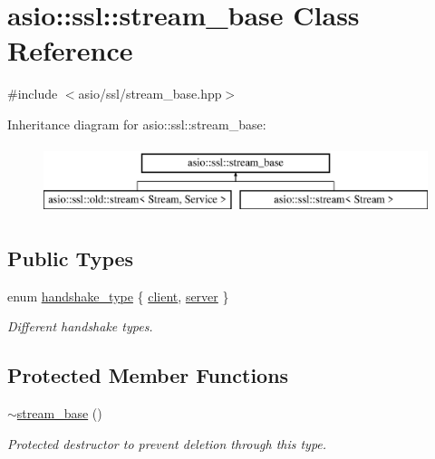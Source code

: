 \hypertarget{classasio_1_1ssl_1_1stream__base}{}\section{asio\+:\+:ssl\+:\+:stream\+\_\+base Class Reference}
\label{classasio_1_1ssl_1_1stream__base}


{\ttfamily \#include $<$asio/ssl/stream\+\_\+base.\+hpp$>$}

Inheritance diagram for asio\+:\+:ssl\+:\+:stream\+\_\+base\+:\begin{figure}[H]
\begin{center}
\leavevmode
\includegraphics[height=2.000000cm]{classasio_1_1ssl_1_1stream__base}
\end{center}
\end{figure}
\subsection*{Public Types}
\begin{DoxyCompactItemize}
\item 
enum \hyperlink{classasio_1_1ssl_1_1stream__base_a2f18813d3860bc8aee99249834d7c320}{handshake\+\_\+type} \{ \hyperlink{classasio_1_1ssl_1_1stream__base_a2f18813d3860bc8aee99249834d7c320a68134fb041cb11ffe46e248ed1e1d73f}{client}, 
\hyperlink{classasio_1_1ssl_1_1stream__base_a2f18813d3860bc8aee99249834d7c320a2f9bac13b8adb5945e7436945061d090}{server}
 \}\begin{DoxyCompactList}\small\item\em Different handshake types. \end{DoxyCompactList}
\end{DoxyCompactItemize}
\subsection*{Protected Member Functions}
\begin{DoxyCompactItemize}
\item 
\hyperlink{classasio_1_1ssl_1_1stream__base_af44f60fc18949a1235701c7ab76848b8}{$\sim$stream\+\_\+base} ()
\begin{DoxyCompactList}\small\item\em Protected destructor to prevent deletion through this type. \end{DoxyCompactList}\end{DoxyCompactItemize}


